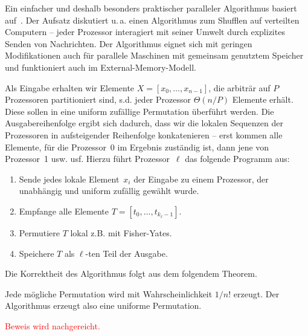 Ein einfacher und deshalb besonders praktischer paralleler Algorithmus basiert auf~\cite{SANDERS2016489}.
Der Aufsatz diskutiert u.\,a. einen Algorithmus zum Shufflen auf verteilten Computern --
jeder Prozessor interagiert mit seiner Umwelt durch explizites Senden von Nachrichten.
Der Algorithmus eignet sich mit geringen Modifikationen auch für parallele Maschinen mit gemeinsam genutztem Speicher und funktioniert auch im External-Memory-Modell.

Als Eingabe erhalten wir Elemente $X=[x_0, \ldots, x_{n-1}]$, die arbiträr auf $P$ Prozessoren partitioniert sind, s.d. jeder Prozessor $\Theta(n/P)$ Elemente erhält.
Diese sollen in eine uniform zufällige Permutation überführt werden.
Die Ausgabereihenfolge ergibt sich dadurch, dass wir die lokalen Sequenzen der Prozessoren in aufsteigender Reihenfolge konkatenieren --
erst kommen alle Elemente, für die Prozessor~0 im Ergebnis zuständig ist, dann jene von Prozessor~1 usw. usf.
Hierzu führt Prozessor~$\ell$ das folgende Programm aus:

\begin{enumerate}
    \item Sende jedes lokale Element~$x_i$ der Eingabe zu einem Prozessor, der unabhängig und uniform zufällig gewählt wurde.
    \item Empfange alle Elemente $T = [t_0, \ldots, t_{k_\ell-1}]$.
          \iffalse\item Berechne die Präfixsumme $\Delta_\ell = \sum_{i=0}^{\ell - 1} k_i$.
          Der Wert $\Delta_\ell$ entspricht dann der Position des ersten Elements von Prozessor~$\ell$ in der Ausgabe.\fi
    \item Permutiere $T$ lokal z.B. mit Fisher-Yates.
    \item Speichere $T$ als $\ell$-ten Teil der Ausgabe.
\end{enumerate}

Die Korrektheit des Algorithmus folgt aus dem folgendem Theorem.

\begin{theorem}
    Jede mögliche Permutation wird mit Wahrscheinlichkeit $1/n!$ erzeugt.
    Der Algorithmus erzeugt also eine uniforme Permutation.
\end{theorem}

\noindent
\textcolor{red}{Beweis wird nachgereicht.}

